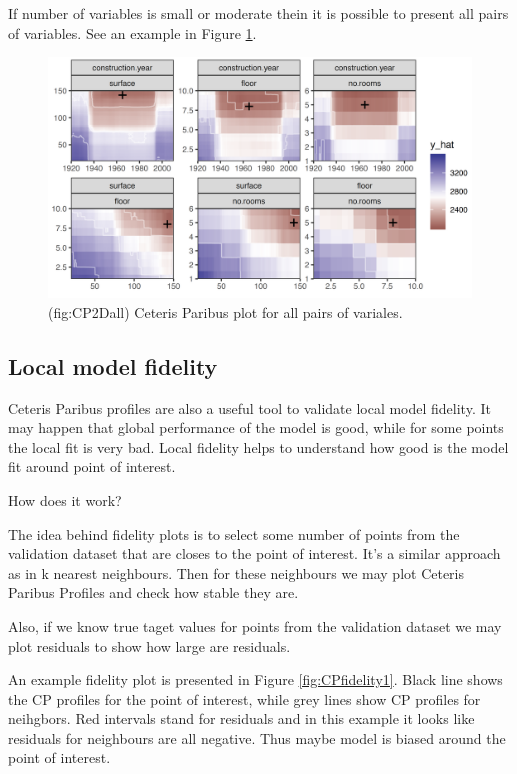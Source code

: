 \documentclass[]{krantz}
\theoremstyle{definition}
\theoremstyle{definition}
\theoremstyle{definition}
\theoremstyle{remark}
\begin{document}
If number of variables is small or moderate thein it is possible to
present all pairs of variables. See an example in Figure
\ref{fig:CP2Dall}.

\begin{figure}

{\centering \includegraphics[width=0.9\linewidth]{figure/cp_2d_all} 

}

\caption{(fig:CP2Dall) Ceteris Paribus plot for all pairs of variales.}\label{fig:CP2Dall}
\end{figure}

\hypertarget{local-model-fidelity}{%
\subsection{Local model fidelity}\label{local-model-fidelity}}

Ceteris Paribus profiles are also a useful tool to validate local model
fidelity. It may happen that global performance of the model is good,
while for some points the local fit is very bad. Local fidelity helps to
understand how good is the model fit around point of interest.

How does it work?

The idea behind fidelity plots is to select some number of points from
the validation dataset that are closes to the point of interest. It's a
similar approach as in k nearest neighbours. Then for these neighbours
we may plot Ceteris Paribus Profiles and check how stable they are.

Also, if we know true taget values for points from the validation
dataset we may plot residuals to show how large are residuals.

An example fidelity plot is presented in Figure \ref{fig:CPfidelity1}.
Black line shows the CP profiles for the point of interest, while grey
lines show CP profiles for neihgbors. Red intervals stand for residuals
and in this example it looks like residuals for neighbours are all
negative. Thus maybe model is biased around the point of interest.
\end{document}
